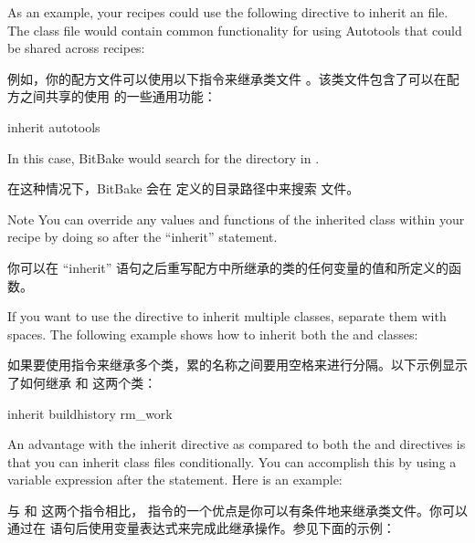 As an example, your recipes could use the following directive to inherit an  file. The class file would contain common functionality for using Autotools that could be shared across recipes:

例如，你的配方文件可以使用以下指令来继承类文件 。该类文件包含了可以在配方之间共享的使用  的一些通用功能：

\begin{pyglist}
inherit autotools
\end{pyglist}

In this case, BitBake would search for the directory  in .

在这种情况下，BitBake 会在  定义的目录路径中来搜索  文件。

\begin{noteblock}{Note}%
You can override any values and functions of the inherited class within your recipe by doing so after the ``inherit'' statement.

\medskip
你可以在 ``inherit'' 语句之后重写配方中所继承的类的任何变量的值和所定义的函数。
\end{noteblock}

If you want to use the directive to inherit multiple classes, separate them with spaces. The following example shows how to inherit both the  and  classes:

如果要使用指令来继承多个类，累的名称之间要用空格来进行分隔。以下示例显示了如何继承  和  这两个类：

\begin{pyglist}
inherit buildhistory rm_work
\end{pyglist}

An advantage with the inherit directive as compared to both the  and  directives is that you can inherit class files conditionally. You can accomplish this by using a variable expression after the  statement. Here is an example:

与  和  这两个指令相比， 指令的一个优点是你可以有条件地来继承类文件。你可以通过在  语句后使用变量表达式来完成此继承操作。参见下面的示例：


